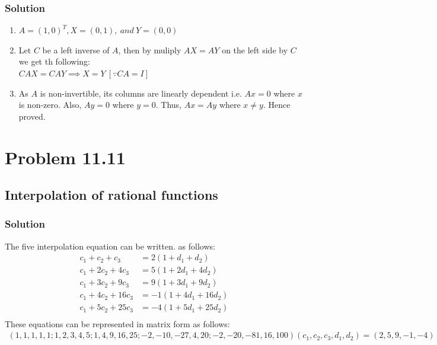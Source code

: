 \documentclass{article}
\begin{document}
\subsubsection*{Solution}
\begin{enumerate}[label=\alph*]
    \item $A = (1,0)^T,X = (0,1),\ and\ Y = (0,0)$
    \item Let $C$ be a left inverse of $A$, then by muliply $AX = AY$ on the left side by $C$ we get th following:\\ 
    $CAX = CAY \implies X = Y\ [\because CA = I]$ 
    \item As $A$ is non-invertible, its columns are linearly dependent i.e. $Ax = 0$ where $x$ is non-zero. Also, $Ay = 0$ where $y=0$. Thus, $Ax = Ay$ where $x\neq y$. Hence proved.
\end{enumerate}
\section*{Problem 11.11}
\subsection*{Interpolation of rational functions}
\subsubsection*{Solution}
The five interpolation equation can be written. as follows: 
    \begin{align*}
        c_1 + c_2 + c_3 & = 2(1 + d_1 + d_2)\\
        c_1 + 2c_2 + 4c_3 & = 5(1 + 2d_1 + 4d_2)\\
        c_1 + 3c_2 + 9c_3 & = 9(1 + 3d_1 + 9d_2)\\
        c_1 + 4c_2 + 16c_3 & = -1(1 + 4d_1 + 16d_2)\\
        c_1 + 5c_2 + 25c_3 & = -4(1 + 5d_1 + 25d_2)\\
    \end{align*}
These equations can be represented in matrix form as follows:
\begin{align*}
(1,1,1,1,1;1,2,3,4,5;1,4,9,16,25;-2,-10,-27,4,20;-2,-20,-81,16,100)(c_1,c_2,c_3,d_1,d_2) = (2,5,9,-1,-4)
\end{align*}
\end{document}
